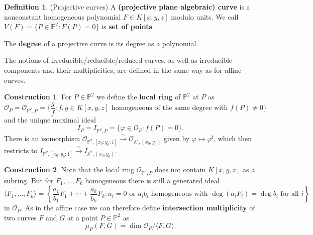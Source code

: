 \documentclass[12pt]{article}
\theoremstyle{definition}
\newtheorem{definition}{Definition}
\newtheorem{construction}{Construction}
\renewcommand{\phi}{\varphi}
\newcommand{\<}{\langle}
\renewcommand{\>}{\rangle}
\newcommand{\A}{\mathbb{A}}
\renewcommand{\P}{\mathbb{P}}
\renewcommand{\O}{\mathscr{O}}
\begin{document}
\begin{definition}(Projective curves)
    A \textbf{(projective plane algebraic) curve} is a nonconstant homogeneous polynomial $F \in K[x, y, z]$ modulo units. We call $V(F) = \{P \in \P^2 : F(P) = 0\}$ is \textbf{set of points}.

    The \textbf{degree} of a projective curve is its degree as a polynomial.

    The notions of irreducible/reducible/reduced curves, as well as irreducible components and their multiplicities, are defined in the same way as for affine curves. 
\end{definition}


\begin{construction}
    For $P \in \P^2$ we define the \textbf{local ring} of $\P^2$ at $P$ as
    \[
        \O_P = \O_{\P^2, P} = \{\frac{g}{f} : f, g \in K[x, y, z] \text{ homogeneous of the same degree with } f(P) \ne 0\}
    \]
    and the unique maximal ideal
    \[
        I_P = I_{\P^2, P} = \{\phi \in \O_P : f(P) = 0\}.
    \]
    There is an isomorphism $\O_{\P^2, [x_0 : y_0 : 1]} \xrightarrow{\sim} \O_{\A^2, (x_0, y_0)}$ given by $\phi \mapsto \phi^{\mathrm{i}}$, which then restricts to $I_{\P^2, [x_0 : y_0 : 1]} \xrightarrow{\sim} I_{\A^2, (x_0, y_0)}$.
\end{construction}




\begin{construction}
    Note that the local ring $\O_{\P^2, P}$ does not contain $K[x, y, z]$ as a subring. But for $F_1, \dots, F_k$ homogeneous there is still a generated ideal
    \[
        \<F_1, \dots, F_k\> = \left\{\frac{a_1}{b_1}F_1 + \cdots + \frac{a_k}{b_k}F_k : a_i = 0 \text{ or $a_ib_i$ homogeneous with $\deg(a_iF_i) = \deg b_i$ for all $i$}\right\}
    \]
    in $\O_P$. As in the affine case we can therefore define \textbf{intersection multiplicity} of two curves $F$ and $G$ at a point $P \in \P^2$ as
    \[
        \mu_P(F, G) = \dim \O_P/\<F, G\>.
    \]
\end{construction}
\end{document}

